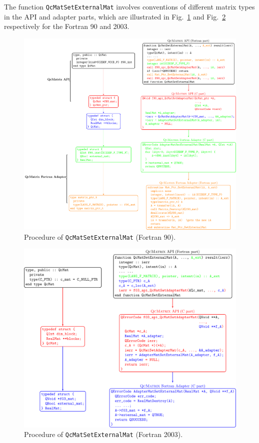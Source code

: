 \documentclass[a4paper,11pt,twoside,openright]{book}
\begin{document}
The function \verb|QcMatSetExternalMat| involves conventions of different
matrix types in the API and adapter parts, which are illustrated in Fig.~\ref{fig-F90-QcMatSetExternalMat}
and Fig.~\ref{fig-F03-QcMatSetExternalMat} respectively for the Fortran 90 and 2003.
\begin{figure}[hbtp]
  \centering
  \includegraphics[width=16cm]{F90_QcMatSetExternalMat.pdf}
  \caption{Procedure of \texttt{QcMatSetExternalMat} (Fortran 90).}
  \label{fig-F90-QcMatSetExternalMat}
\end{figure}

\begin{figure}[hbtp]
  \centering
  \includegraphics[width=16cm]{F03_QcMatSetExternalMat.pdf}
  \caption{Procedure of \texttt{QcMatSetExternalMat} (Fortran 2003).}
  \label{fig-F03-QcMatSetExternalMat}
\end{figure}
\end{document}
